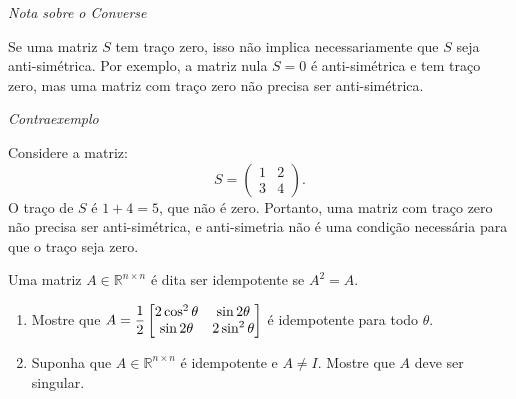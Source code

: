 \begin{resolution}
    {\it Nota sobre o Converse}

  Se uma matriz \( S \) tem traço zero, isso não implica necessariamente que \( S \) seja anti-simétrica. Por exemplo, a matriz nula \( S = 0 \) é anti-simétrica e tem traço zero, mas uma matriz com traço zero não precisa ser anti-simétrica.

  {\it Contraexemplo}

  Considere a matriz:
  \begin{equation}
    S = \begin{pmatrix}
      1 & 2 \\
      3 & 4
    \end{pmatrix}.
  \end{equation}
  O traço de \( S \) é \( 1 + 4 = 5 \), que não é zero. Portanto, uma matriz com traço zero não precisa ser anti-simétrica, e anti-simetria não é uma condição necessária para que o traço seja zero.
\end{resolution}

\begin{question}
  Uma matriz $A \in \mathbb{R}^{n \times n}$ é dita ser idempotente se $A^2 = A$.
  \begin{enumerate}[label=(\alph*)]
    \item Mostre que $A = \displaystyle \frac{1}{2} \begin{bmatrix}2\cos^2\theta & \sin 2\theta \\ \sin 2\theta & 2 \sin^2\theta\end{bmatrix}$ é idempotente para todo $\theta$.
    \item Suponha que $A \in \mathbb{R}^{n \times n}$ é idempotente e $A \neq I$. Mostre que $A$ deve ser singular.
  \end{enumerate}
\end{question}

